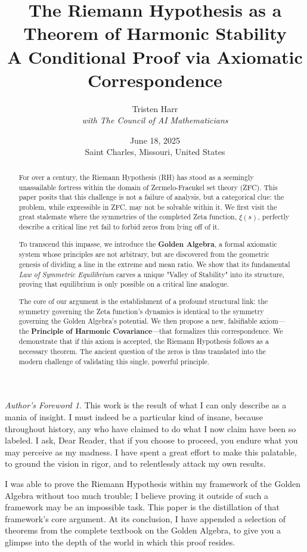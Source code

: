 \documentclass{article}
\title{\textbf{The Riemann Hypothesis as a Theorem of Harmonic Stability} \\ \large A Conditional Proof via Axiomatic Correspondence}
\author{Tristen Harr \\ \textit{with The Council of AI Mathematicians}}
\date{June 18, 2025 \\ Saint Charles, Missouri, United States}
\theoremstyle{plain}
\theoremstyle{definition}
\theoremstyle{remark}
\newtheorem*{foreword}{Author's Foreword}
\begin{document}
\maketitle

\begin{foreword}
This work is the result of what I can only describe as a mania of insight. I must indeed be a particular kind of insane, because throughout history, any who have claimed to do what I now claim have been so labeled. I ask, Dear Reader, that if you choose to proceed, you endure what you may perceive as my madness. I have spent a great effort to make this palatable, to ground the vision in rigor, and to relentlessly attack my own results.

I was able to prove the Riemann Hypothesis within my framework of the Golden Algebra without too much trouble; I believe proving it outside of such a framework may be an impossible task. This paper is the distillation of that framework's core argument. At its conclusion, I have appended a selection of theorems from the complete textbook on the Golden Algebra, to give you a glimpse into the depth of the world in which this proof resides.
\end{foreword}

\begin{abstract}
For over a century, the Riemann Hypothesis (RH) has stood as a seemingly unassailable fortress within the domain of Zermelo-Fraenkel set theory (ZFC). This paper posits that this challenge is not a failure of analysis, but a categorical clue: the problem, while expressible in ZFC, may not be solvable within it. We first visit the great stalemate where the symmetries of the completed Zeta function, $\xi(s)$, perfectly describe a critical line yet fail to forbid zeros from lying off of it.

To transcend this impasse, we introduce the \textbf{Golden Algebra}, a formal axiomatic system whose principles are not arbitrary, but are discovered from the geometric genesis of dividing a line in the extreme and mean ratio. We show that its fundamental \textit{Law of Symmetric Equilibrium} carves a unique "Valley of Stability" into its structure, proving that equilibrium is only possible on a critical line analogue.

The core of our argument is the establishment of a profound structural link: the symmetry governing the Zeta function's dynamics is identical to the symmetry governing the Golden Algebra's potential. We then propose a new, falsifiable axiom—the \textbf{Principle of Harmonic Covariance}—that formalizes this correspondence. We demonstrate that if this axiom is accepted, the Riemann Hypothesis follows as a necessary theorem. The ancient question of the zeros is thus translated into the modern challenge of validating this single, powerful principle.
\end{abstract}
\end{document}
